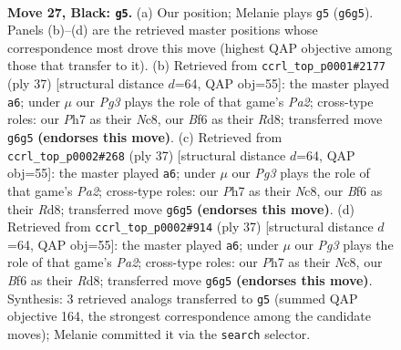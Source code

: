 \documentclass[11pt]{article}
\begin{document}
\clearpage

\begin{figure}[p]\centering
\begin{subfigure}{0.46\textwidth}\centering
\resizebox{\linewidth}{!}{%
\newchessgame
\chessboard[
  setfen={2r3nr/p4k1p/2p2bp1/8/5B2/3B1P1P/PPP2KP1/RR6 b - - 5 27},
  showmover=false,
  pgfstyle=straightmove, color=movearrow, markmove={g6-g5}
]}
\caption{}
\end{subfigure}\hfill
\begin{subfigure}{0.46\textwidth}\centering
\resizebox{\linewidth}{!}{%
\newchessgame
\chessboard[
  setfen={2nrkb1r/pp4pp/5p2/3Pp3/8/1PN1B3/1P3PPP/R2R2K1 b k - 1 19},
  showmover=false,
  pgfstyle=straightmove, color=movearrow, markmove={a7-a6}
]}
\caption{}
\end{subfigure}
\\[4pt]
\begin{subfigure}{0.46\textwidth}\centering
\resizebox{\linewidth}{!}{%
\newchessgame
\chessboard[
  setfen={2nrkb1r/pp4pp/5p2/3Pp3/8/1PN1B3/1P3PPP/R2R2K1 b k - 1 19},
  showmover=false,
  pgfstyle=straightmove, color=movearrow, markmove={a7-a6}
]}
\caption{}
\end{subfigure}\hfill
\begin{subfigure}{0.46\textwidth}\centering
\resizebox{\linewidth}{!}{%
\newchessgame
\chessboard[
  setfen={2nrkb1r/pp4pp/5p2/3Pp3/8/1PN1B3/1P3PPP/R2R2K1 b k - 1 19},
  showmover=false,
  pgfstyle=straightmove, color=movearrow, markmove={a7-a6}
]}
\caption{}
\end{subfigure}
\caption{\textbf{Move 27, Black: \texttt{g5}.} (a) Our position; Melanie plays \texttt{g5} (\texttt{g6g5}). Panels (b)--(d) are the retrieved master positions whose correspondence most drove this move (highest QAP objective among those that transfer to it). (b) Retrieved from \texttt{ccrl\_top\_p0001\#2177} (ply 37) [structural distance $d$=64, QAP obj=55]: the master played \texttt{a6}; under $\mu$ our \emph{Pg3} plays the role of that game's \emph{Pa2}; cross-type roles: our \emph{P}h7 as their \emph{N}c8, our \emph{B}f6 as their \emph{R}d8; transferred move \texttt{g6g5} \textbf{(endorses this move)}. (c) Retrieved from \texttt{ccrl\_top\_p0002\#268} (ply 37) [structural distance $d$=64, QAP obj=55]: the master played \texttt{a6}; under $\mu$ our \emph{Pg3} plays the role of that game's \emph{Pa2}; cross-type roles: our \emph{P}h7 as their \emph{N}c8, our \emph{B}f6 as their \emph{R}d8; transferred move \texttt{g6g5} \textbf{(endorses this move)}. (d) Retrieved from \texttt{ccrl\_top\_p0002\#914} (ply 37) [structural distance $d$=64, QAP obj=55]: the master played \texttt{a6}; under $\mu$ our \emph{Pg3} plays the role of that game's \emph{Pa2}; cross-type roles: our \emph{P}h7 as their \emph{N}c8, our \emph{B}f6 as their \emph{R}d8; transferred move \texttt{g6g5} \textbf{(endorses this move)}. Synthesis: 3 retrieved analogs transferred to \texttt{g5} (summed QAP objective 164, the strongest correspondence among the candidate moves); Melanie committed it via the \texttt{search} selector.}
\label{fig:thought-m53}
\end{figure}
\end{document}
